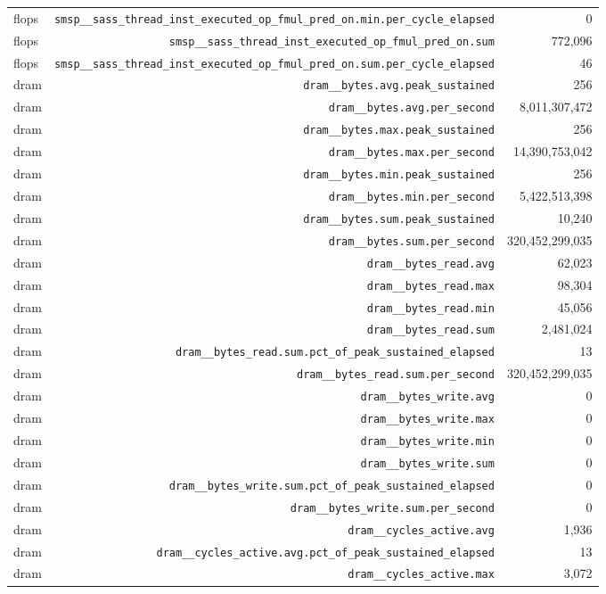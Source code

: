 \begin{table}[h]
\begin{tabular}{|l|r|r|}
flops & \texttt{smsp__sass_thread_inst_executed_op_fmul_pred_on.min.per_cycle_elapsed} & 0 \\
flops & \texttt{smsp__sass_thread_inst_executed_op_fmul_pred_on.sum} & 772,096 \\
flops & \texttt{smsp__sass_thread_inst_executed_op_fmul_pred_on.sum.per_cycle_elapsed} & 46 \\
\hline
dram & \texttt{dram__bytes.avg.peak_sustained} & 256 \\
dram & \texttt{dram__bytes.avg.per_second} & 8,011,307,472 \\
dram & \texttt{dram__bytes.max.peak_sustained} & 256 \\
dram & \texttt{dram__bytes.max.per_second} & 14,390,753,042 \\
dram & \texttt{dram__bytes.min.peak_sustained} & 256 \\
dram & \texttt{dram__bytes.min.per_second} & 5,422,513,398 \\
dram & \texttt{dram__bytes.sum.peak_sustained} & 10,240 \\
dram & \texttt{dram__bytes.sum.per_second} & 320,452,299,035 \\
dram & \texttt{dram__bytes_read.avg} & 62,023 \\
dram & \texttt{dram__bytes_read.max} & 98,304 \\
dram & \texttt{dram__bytes_read.min} & 45,056 \\
dram & \texttt{dram__bytes_read.sum} & 2,481,024 \\
dram & \texttt{dram__bytes_read.sum.pct_of_peak_sustained_elapsed} & 13 \\
dram & \texttt{dram__bytes_read.sum.per_second} & 320,452,299,035 \\
dram & \texttt{dram__bytes_write.avg} & 0 \\
dram & \texttt{dram__bytes_write.max} & 0 \\
dram & \texttt{dram__bytes_write.min} & 0 \\
dram & \texttt{dram__bytes_write.sum} & 0 \\
dram & \texttt{dram__bytes_write.sum.pct_of_peak_sustained_elapsed} & 0 \\
dram & \texttt{dram__bytes_write.sum.per_second} & 0 \\
dram & \texttt{dram__cycles_active.avg} & 1,936 \\
dram & \texttt{dram__cycles_active.avg.pct_of_peak_sustained_elapsed} & 13 \\
dram & \texttt{dram__cycles_active.max} & 3,072 \\

\end{tabular}
\end{table}
